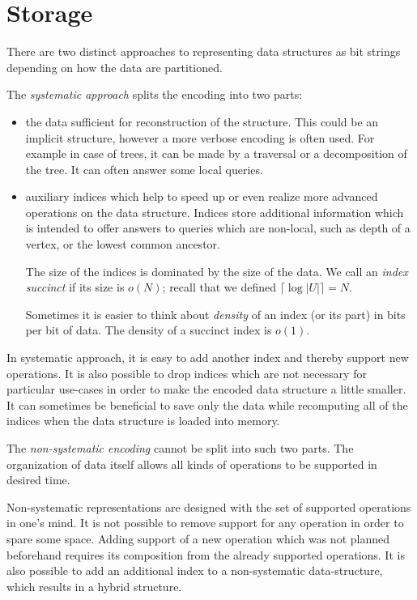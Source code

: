\section{Storage}

There are two distinct approaches to representing data structures as bit strings depending on how the data are partitioned.

The \emph{systematic approach} splits the encoding into two parts:
\begin{itemize}
	\item the data sufficient for reconstruction of the structure.
	This could be an implicit structure, however a more verbose encoding is often used.
	For example in case of trees, it can be made by a traversal or a decomposition of the tree.
	It can often answer some local queries.
	\item auxiliary indices which help to speed up or even realize more advanced operations on the data structure.
	Indices store additional information which is intended to offer answers to queries which are non-local, such as depth of a vertex, or the lowest common ancestor.

	The size of the indices is dominated by the size of the data.	
	We call an \emph{index succinct} if its size is $o(N)$; recall that we defined $\lceil \log |U| \rceil = N$.
	
	Sometimes it is easier to think about \emph{density} of an index (or its part) in bits per bit of data.
	The density of a succinct index is $o(1)$.
\end{itemize}

In systematic approach, it is easy to add another index and thereby support new operations.
It is also possible to drop indices which are not necessary for particular use-cases in order to make the encoded data structure a little smaller.
It can sometimes be beneficial to save only the data while recomputing all of the indices when the data structure is loaded into memory.

\bigbreak

The \emph{non-systematic encoding} cannot be split into such two parts.
The organization of data itself allows all kinds of operations to be supported in desired time.

Non-systematic representations are designed with the set of supported operations in one's mind.
It is not possible to remove support for any operation in order to spare some space.
Adding support of a new operation which was not planned beforehand requires its composition from the already supported operations.
It is also possible to add an additional index to a non-systematic data-structure, which results in a hybrid structure.

